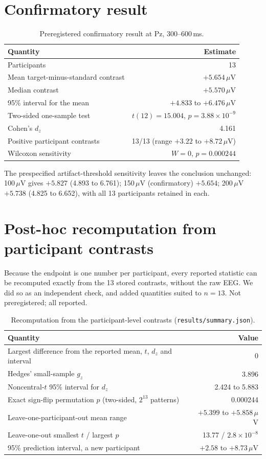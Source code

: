 \documentclass[11pt]{article}
\begin{document}
\section{Confirmatory result}
\begin{table}[h]
\centering\small
\begin{tabular}{lr}
\toprule
Quantity & Estimate\\
\midrule
Participants & 13\\
Mean target-minus-standard contrast & $+5.654\,\mu$V\\
Median contrast & $+5.570\,\mu$V\\
95\% interval for the mean & $+4.833$ to $+6.476\,\mu$V\\
Two-sided one-sample test & $t(12)=15.004$, $p=3.88\times10^{-9}$\\
Cohen's $d_z$ & 4.161\\
Positive participant contrasts & 13/13 (range $+3.22$ to $+8.72\,\mu$V)\\
Wilcoxon sensitivity & $W=0$, $p=0.000244$\\
\bottomrule
\end{tabular}
\caption{Preregistered confirmatory result at Pz, 300--600\,ms.}
\end{table}
The prespecified artifact-threshold sensitivity leaves the conclusion unchanged: 100\,$\mu$V gives $+5.827$ (4.893 to 6.761);
150\,$\mu$V (confirmatory) $+5.654$; 200\,$\mu$V $+5.738$ (4.825 to 6.652), with all 13 participants retained in each.

\section{Post-hoc recomputation from participant contrasts}
Because the endpoint is one number per participant, every reported statistic can be recomputed exactly from the 13 stored contrasts,
without the raw EEG. We did so as an independent check, and added quantities suited to $n=13$. Not preregistered; all reported.
\begin{table}[h]
\centering\small
\begin{tabular}{lr}
\toprule
Quantity & Value\\
\midrule
Largest difference from the reported mean, $t$, $d_z$ and interval & 0\\
Hedges' small-sample $g_z$~\cite{hedges1981} & 3.896\\
Noncentral-$t$ 95\% interval for $d_z$ & 2.424 to 5.883\\
Exact sign-flip permutation $p$ (two-sided, $2^{13}$ patterns) & 0.000244\\
Leave-one-participant-out mean range & $+5.399$ to $+5.858\,\mu$V\\
Leave-one-out smallest $t$ / largest $p$ & 13.77 / $2.8\times10^{-8}$\\
95\% prediction interval, a new participant & $+2.58$ to $+8.73\,\mu$V\\
\bottomrule
\end{tabular}
\caption{Recomputation from the participant-level contrasts (\texttt{results/summary.json}).}
\end{table}
\end{document}
